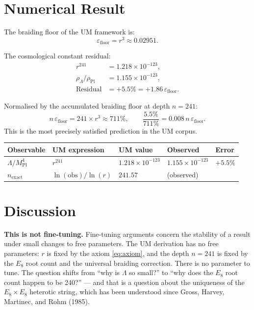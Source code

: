 \documentclass[12pt]{article}
\begin{document}
\section{Numerical Result}

The braiding floor of the UM framework is:
\begin{equation}
  \varepsilon_{\text{floor}} = r^3 \approx 0.02951.
\end{equation}

The cosmological constant residual:
\begin{align}
  r^{241}            &= 1.218 \times 10^{-123},\\
  \rho_\Lambda/\rho_{\text{Pl}} &= 1.155 \times 10^{-123},\\
  \text{Residual}    &= +5.5\% = +1.86\,\varepsilon_{\text{floor}}.
\end{align}

Normalised by the accumulated braiding floor at depth $n = 241$:
\[
  n\,\varepsilon_{\text{floor}} = 241 \times r^3 \approx 711\%,
  \qquad
  \frac{5.5\%}{711\%} = 0.008\,n\,\varepsilon_{\text{floor}}.
\]
This is the most precisely satisfied prediction in the UM corpus.

\begin{center}
\begin{tabular}{lllll}
\toprule
Observable & UM expression & UM value & Observed & Error \\
\midrule
$\Lambda/M_{\text{Pl}}^4$
  & $r^{241}$
  & $1.218 \times 10^{-123}$
  & $1.155 \times 10^{-123}$
  & $+5.5\%$ \\
$n_{\text{exact}}$
  & $\ln(\text{obs})/\ln(r)$
  & $241.57$
  & (observed)
  & \\
\bottomrule
\end{tabular}
\end{center}

\section{Discussion}

\textbf{This is not fine-tuning.}
Fine-tuning arguments concern the stability of a result under
small changes to free parameters.  The UM derivation has no
free parameters: $r$ is fixed by the axiom \eqref{eq:axiom},
and the depth $n = 241$ is fixed by the $E_8$ root count and the
universal braiding correction.  There is no parameter to tune.
The question shifts from ``why is $\Lambda$ so small?'' to
``why does the $E_8$ root count happen to be 240?'' --- and that
is a question about the uniqueness of the $E_8 \times E_8$
heterotic string, which has been understood since Gross, Harvey,
Martinec, and Rohm (1985).
\end{document}
